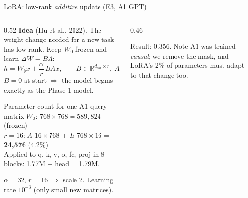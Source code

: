 \documentclass[aspectratio=169,11pt]{beamer}
\begin{document}
\begin{frame}{LoRA: low-rank \emph{additive} update (E3, A1 GPT)}
  \begin{columns}[T]
    \begin{column}{0.52\textwidth}
      \footnotesize
      \textbf{Idea} (Hu et al., 2022). The weight change needed for a new task has low rank.
      Keep $W_0$ frozen and learn $\Delta W = BA$:
      $$h = W_0 x + \frac{\alpha}{r}\, B A x, \qquad B\in\mathbb{R}^{d_{out}\times r},\ A\in\mathbb{R}^{r\times d_{in}}$$
      $B = 0$ at start $\Rightarrow$ the model begins exactly as the Phase-1 model.
      \vspace{1mm}

      \begin{exampleblock}{Parameter count for one A1 query matrix}
        $W_0$: $768\times768 = 589{,}824$ (frozen)\\
        $r=16$: $A$ $16\times768$ + $B$ $768\times16$ = \textbf{24{,}576} (4.2\%)\\
        Applied to q, k, v, o, fc, proj in 8 blocks: 1.77M + head = 1.79M.
      \end{exampleblock}
      $\alpha=32$, $r=16$ $\Rightarrow$ scale 2. Learning rate $10^{-3}$ (only small new matrices).
    \end{column}
    \begin{column}{0.46\textwidth}
      \begin{center}
      \end{center}
      \footnotesize
      Result: 0.356. Note A1 was trained \emph{causal}; we remove the mask, and
      LoRA's 2\% of parameters must adapt to that change too.
    \end{column}
  \end{columns}
\end{frame}
\end{document}
